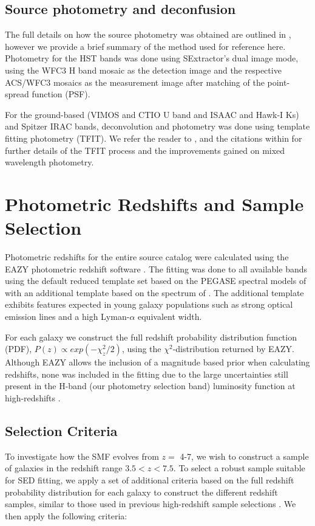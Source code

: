 \subsection{Source photometry and deconfusion}
The full details on how the source photometry was obtained are outlined in \citet{Guo:2013ig}, however we provide a brief summary of the method used for reference here. Photometry for the HST bands was done using SExtractor's dual image mode, using the WFC3 H band mosaic as the detection image and the respective ACS/WFC3 mosaics as the measurement image after matching of the point-spread function (PSF). 

For the ground-based (VIMOS and CTIO U band and ISAAC and Hawk-I Ks) and Spitzer IRAC bands, deconvolution and photometry was done using template fitting photometry (TFIT). We refer the reader to \citet{Laidler:2007iy}, \citet{2012ApJ...752...66L} and the citations within for further details of the TFIT process and the improvements gained on mixed wavelength photometry.


\section{Photometric Redshifts and Sample Selection}\label{sec:redshift}
Photometric redshifts for the entire source catalog were calculated using the EAZY photometric redshift software \citep{Brammer:2008gn}. The fitting was done to all available bands using the default reduced template set based on the PEGASE spectral models of \citet{1997A&A...326..950F} with an additional template based on the spectrum of \citet{2010ApJ...719.1168E}. The additional template exhibits features expected in young galaxy populations such as strong optical emission lines and a high Lyman-$\alpha$ equivalent width.

For each galaxy we construct the full redshift probability distribution function (PDF), $P(z) \propto exp(-\chi_{z}^2/2)$, using the $\chi^2$-distribution returned by EAZY. 
Although EAZY allows the inclusion of a magnitude based prior when calculating redshifts, none was included in the fitting due to the large uncertainties still present in the H-band (our photometry selection band) luminosity function at high-redshifts \citep{Henriques:2012gs}.

\subsection{Selection Criteria} \label{sec:sample}
To investigate how the SMF evolves from $z =$ 4-7, we wish to construct a sample of galaxies in the redshift range $3.5 < z < 7.5$. To select a robust sample suitable for SED fitting, we apply a set of additional criteria based on the full redshift probability distribution for each galaxy to construct the different redshift samples, similar to those used in previous high-redshift sample selections \citep{2011MNRAS.418.2074M,Finkelstein:2012hr}. We then apply the following criteria:


